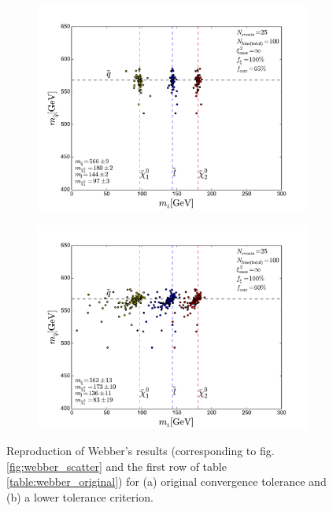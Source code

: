 \documentclass[twoside,english]{uiofysmaster}
\begin{document}
\begin{figure}[hbt]
	\centering
	\begin{subfigure}[b]{0.6\textwidth}
		\includegraphics[width=\textwidth]{figures/webber_rec_table/webber_rec_table-samesettings_0psmear-nocut.pdf} 
		\caption{ }
		\label{fig:webber_rec_scatter_tolerance-comparison_a}
	\end{subfigure}

	\begin{subfigure}[b]{0.6\textwidth}
		\includegraphics[width=\textwidth]{figures/webber_rec_table/webber_HW-rec_nocut.pdf}
		\caption{ } 
		\label{fig:webber_rec_scatter_tolerance-comparison_b}
	\end{subfigure}
	\caption{Reproduction of Webber's results (corresponding to fig. \ref{fig:webber_scatter} and the first row of table \ref{table:webber_original}) for (a) original convergence tolerance and (b) a lower tolerance criterion.}
	\label{fig:webber_rec_scatter_tolerance-comparison}
\end{figure}
\end{document}
